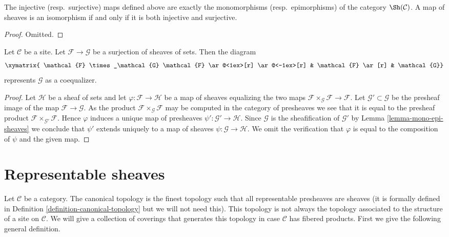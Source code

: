\begin{lemma}
\label{lemma-mono-epi-sheaves}
The injective (resp.\ surjective) maps defined above
are exactly the monomorphisms (resp.\ epimorphisms) of
the category $\Sh(\mathcal{C})$. A map of sheaves
is an isomorphism if and only if it is both injective
and surjective.
\end{lemma}

\begin{proof}
Omitted.
\end{proof}

\begin{lemma}
\label{lemma-coequalizer-surjection}
Let $\mathcal{C}$ be a site. Let $\mathcal{F} \to \mathcal{G}$
be a surjection of sheaves of sets. Then the diagram
$$
\xymatrix{
\mathcal{F} \times_\mathcal{G} \mathcal{F}
\ar@<1ex>[r] \ar@<-1ex>[r]
&
\mathcal{F} \ar[r]
&
\mathcal{G}}
$$
represents $\mathcal{G}$ as a coequalizer.
\end{lemma}

\begin{proof}
Let $\mathcal{H}$ be a sheaf of sets and let
$\varphi : \mathcal{F} \to \mathcal{H}$ be a map of sheaves equalizing
the two maps $\mathcal{F} \times_\mathcal{G} \mathcal{F} \to \mathcal{F}$.
Let $\mathcal{G}' \subset \mathcal{G}$ be the presheaf image of
the map $\mathcal{F} \to \mathcal{G}$. As the product
$\mathcal{F} \times_\mathcal{G} \mathcal{F}$ may be computed in the
category of presheaves we see that it is equal to the presheaf product
$\mathcal{F} \times_{\mathcal{G}'} \mathcal{F}$. Hence $\varphi$
induces a unique map of presheaves $\psi' : \mathcal{G}' \to \mathcal{H}$.
Since $\mathcal{G}$ is the sheafification of $\mathcal{G}'$ by
Lemma \ref{lemma-mono-epi-sheaves}
we conclude that $\psi'$ extends uniquely to a map of sheaves
$\psi : \mathcal{G} \to \mathcal{H}$. We omit the verification that
$\varphi$ is equal to the composition of $\psi$ and the given map.
\end{proof}














\section{Representable sheaves}
\label{section-representable-sheaves}

\noindent
Let $\mathcal{C}$ be a category. The canonical topology is
the finest topology such that all representable presheaves
are sheaves (it is formally defined in
Definition \ref{definition-canonical-topology} but we will not
need this).
This topology is not always the topology associated to the
structure of a site on $\mathcal{C}$.
We will give a collection of coverings that generates this topology
in case $\mathcal{C}$ has fibered products. First we give
the following general definition.

